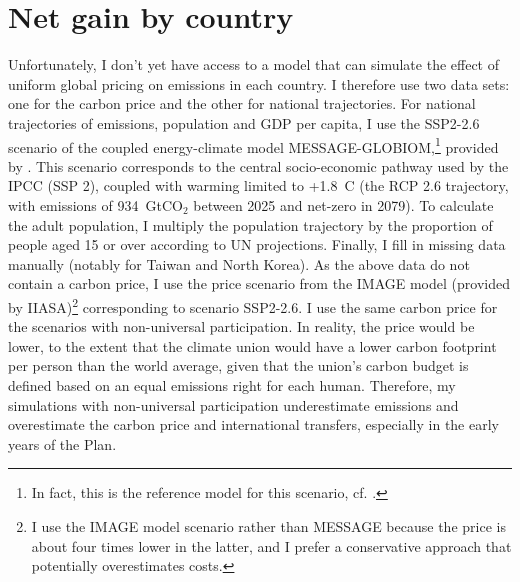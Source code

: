 \documentclass[a5paper,english,openany]{memoir}
\begin{document}
\section*{Net gain by country}\label{app:pays} 

Unfortunately, I don't yet have access to a model that can simulate the effect of uniform global pricing on emissions in each country. I therefore use two data sets: one for the carbon price and the other for national trajectories. For national trajectories of emissions, population and GDP per capita, I use the SSP2-2.6 scenario of the coupled energy-climate model MESSAGE-GLOBIOM,\footnote{In fact, this is the reference model for this scenario, cf. \cite{fricko_marker_2017}.} provided by \cite{gutschow_country-resolved_2021}. This scenario corresponds to the central socio-economic pathway used by the IPCC (SSP 2), coupled with warming limited to +1.8~\textdegree{}C (the RCP 2.6 trajectory, with emissions of 934~GtCO$_\text{2}$ between 2025 and net-zero in 2079). To calculate the adult population, I multiply the population trajectory by the proportion of people aged 15 or over according to UN projections. Finally, I fill in missing data manually (notably for Taiwan and North Korea). As the above data do not contain a carbon price, I use the price scenario from the IMAGE model (provided by IIASA)\footnote{I use the IMAGE model scenario rather than MESSAGE because the price is about four times lower in the latter, and I prefer a conservative approach that potentially overestimates costs. 
} corresponding to scenario SSP2-2.6. I use the same carbon price for the scenarios with non-universal participation. In reality, the price would be lower, to the extent that the climate union would have a lower carbon footprint per person than the world average, given that the union's carbon budget is defined based on an equal emissions right for each human. Therefore, my simulations with non-universal participation underestimate emissions and overestimate the carbon price and international transfers, especially in the early years of the Plan.
\end{document}
